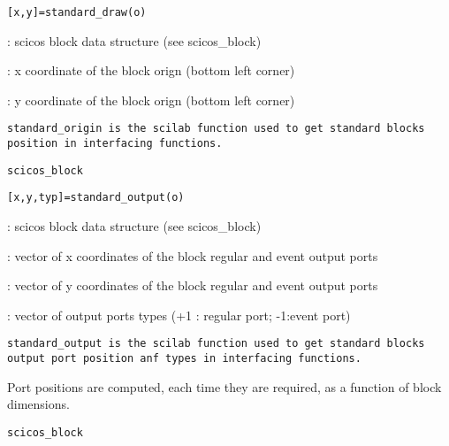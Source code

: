 \label{standardorigin}

\begin{verbatim}
[x,y]=standard_draw(o)
\end{verbatim}
\begin{scitem}
\item[{\verb?o?}]
: scicos block data structure (see scicos\_block)
\item[{\verb?x?}]
: x coordinate of the block orign (bottom left corner)
\item[{\verb?y?}]
: y coordinate of the block orign (bottom left corner)
\end{scitem}%
%
\tt standard\_origin %
\rm is the scilab function used to get
standard blocks position in interfacing functions. 

{\verb?scicos_block?} \pageref{scicosblock}
%
%


\label{standardoutput}

\begin{verbatim}
[x,y,typ]=standard_output(o)
\end{verbatim}
\begin{scitem}
\item[{\verb?o?}]
: scicos block data structure (see scicos\_block)
\item[{\verb?x?}]
: vector of x coordinates of the block regular and event output ports
\item[{\verb?y?}]
: vector of y coordinates of the block regular and event output ports
\item[{\verb?typ?}]
: vector of output ports types (+1 : regular port; -1:event port)

\end{scitem}%
%
\tt standard\_output %
\rm is the scilab function used to get
standard blocks output port position anf types in interfacing
functions. 
\par\noindent
Port positions are computed, each time they are required, as a
function of block dimensions.

{\verb?scicos_block?} \pageref{scicosblock}

